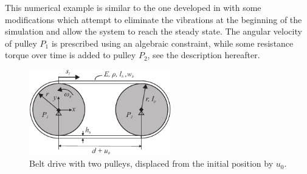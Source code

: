 %
This numerical example is similar to the one developed in \cite{Pechstein2013} with some modifications which attempt to eliminate the vibrations at the beginning of the simulation and allow the system to reach the steady state. The angular velocity of pulley $P_1$ is prescribed using an algebraic constraint, while some resistance torque over time is added to pulley $P_2$, see the description hereafter.
\begin{figure}[tbph]
    \centering
    \includegraphics[width=0.55\textwidth]{figures/ESR8_beltPechstein.pdf}
    \caption{Belt drive with two pulleys, displaced from the initial position by $u_0$.}
    \label{fig:ESR8_BeltDrive}
\end{figure}
